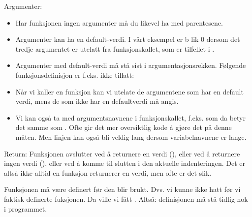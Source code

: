 Argumenter:
\begin{itemize}
\item Har funksjonen ingen argumenter må du likevel ha med parentesene. 
\item Argumenter kan ha en default-verdi. I vårt eksempel er b lik 0 dersom det tredje argumentet er utelatt fra funksjonskallet, som er tilfellet i .
\item Argumenter med default-verdi må stå sist i argumentasjonsrekken. Følgende funksjonsdefinisjon er f.eks. ikke tillatt:  
\item Når vi kaller en funksjon kan vi utelate de argumentene som har en default verdi, mens de som ikke har en defaultverdi må angis. 
\item Vi kan også ta med argumentsnavnene i funksjonskallet, f.eks.  som da betyr det samme som . Ofte gir det mer oversiktlig kode å gjøre det på denne måten. Men linjen kan også bli veldig lang dersom variabelnavnene er lange. 
\end{itemize}

Return: 
Funksjonen avslutter ved å returnere en verdi (), eller ved å returnere ingen verdi (), eller ved å komme til slutten i den aktuelle indenteringen. Det er altså ikke alltid en funksjon returnerer en verdi, men ofte er det slik. 

Funksjonen må være definert før den blir brukt. Dvs. vi kunne ikke hatt  før vi faktisk definerte fuksjonen. Da ville vi fått . Altså: definisjonen må stå tidlig nok i programmet. 

